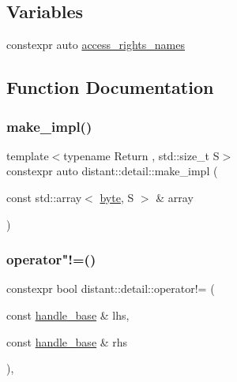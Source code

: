 \subsection*{Variables}
\begin{DoxyCompactItemize}
\item 
constexpr auto \mbox{\hyperlink{namespacedistant_1_1detail_a0ce94debf8f2816a9adaf6c49119f6a9}{access\+\_\+rights\+\_\+names}}
\end{DoxyCompactItemize}


\subsection{Function Documentation}
\mbox{\label{namespacedistant_1_1detail_a9eff3899795b40a419c24bc7f6b36785}} 
\subsubsection{\texorpdfstring{make\+\_\+impl()}{make\_impl()}}
{\footnotesize\ttfamily template$<$typename Return , std\+::size\+\_\+t S$>$ \\
constexpr auto distant\+::detail\+::make\+\_\+impl (\begin{DoxyParamCaption}\item[{const std\+::array$<$ \mbox{\hyperlink{namespacedistant_af9c3f04a9b855a1368d6c1a9ce28c2f4}{byte}}, S $>$ \&}]{array }\end{DoxyParamCaption})\hspace{0.3cm}{\ttfamily [noexcept]}}

\mbox{\label{namespacedistant_1_1detail_a2f6761ad9fb93f6989d37774e16e415c}} 
\subsubsection{\texorpdfstring{operator"!=()}{operator!=()}}
{\footnotesize\ttfamily constexpr bool distant\+::detail\+::operator!= (\begin{DoxyParamCaption}\item[{const \mbox{\hyperlink{classdistant_1_1detail_1_1handle__base}{handle\+\_\+base}} \&}]{lhs,  }\item[{const \mbox{\hyperlink{classdistant_1_1detail_1_1handle__base}{handle\+\_\+base}} \&}]{rhs }\end{DoxyParamCaption})\hspace{0.3cm}{\ttfamily [inline]}, {\ttfamily [noexcept]}}

